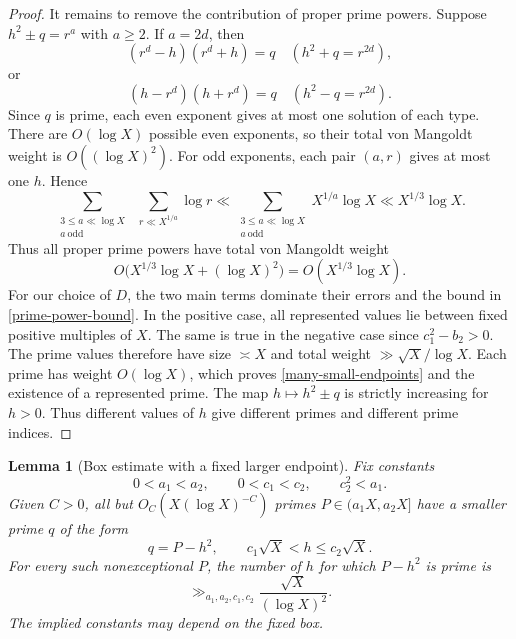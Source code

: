 \documentclass[12pt,reqno]{amsart}
\numberwithin{equation}{section}
\theoremstyle{plain}
\newtheorem{lemma}[theorem]{Lemma}
\theoremstyle{remark}
\begin{document}
\begin{proof}
It remains to remove the contribution of proper prime powers.  Suppose
$h^2\pm q=r^a$ with $a\geq2$.
If $a=2d$, then
\[
 (r^d-h)(r^d+h)=q\quad(h^2+q=r^{2d}),
\]
or
\[
 (h-r^d)(h+r^d)=q\quad(h^2-q=r^{2d}).
\]
Since $q$ is prime, each even exponent gives at most one solution of
each type.  There are $O(\log X)$ possible even exponents, so their
total von Mangoldt weight is $O((\log X)^2)$.  For odd exponents, each
pair $(a,r)$ gives at most one $h$.  Hence
\[
 \sum_{\substack{3\leq a\ll\log X\\a\ \mathrm{odd}}}
 \ \,\sum_{r\ll X^{1/a}}\log r
 \ll\sum_{\substack{3\leq a\ll\log X\\a\ \mathrm{odd}}}
 X^{1/a}\log X
 \ll X^{1/3}\log X.
\]
Thus all proper prime powers have total von Mangoldt weight
\begin{equation}\label{prime-power-bound}
 O\bigl(X^{1/3}\log X+(\log X)^2\bigr)
 =O(X^{1/3}\log X).
\end{equation}
For our choice of $D$, the two main terms dominate their errors and
the bound in \eqref{prime-power-bound}.  In the positive case, all
represented values lie between fixed positive multiples of $X$.  The
same is true in the negative case since $c_1^2-b_2>0$.  The prime
values therefore have size $\asymp X$ and total weight
$\gg\sqrt X/\log X$.  Each prime has weight $O(\log X)$, which proves
\eqref{many-small-endpoints} and the existence of a represented
prime.  The map $h\mapsto h^2\pm q$ is strictly increasing for $h>0$.
Thus different values of $h$ give different primes and different
prime indices.
\end{proof}

\begin{lemma}[Box estimate with a fixed larger endpoint]
\label{lem:good-large}
Fix constants
\begin{equation}\label{large-box-constants}
 0<a_1<a_2,\qquad 0<c_1<c_2,\qquad c_2^2<a_1.
\end{equation}
Given $C>0$, all but $O_C(X(\log X)^{-C})$ primes
$P\in(a_1X,a_2X]$ have a smaller prime $q$ of the form
\begin{equation*}\label{reverse-prime-in-box}
 q=P-h^2,
 \qquad c_1\sqrt X<h\leq c_2\sqrt X.
\end{equation*}
For every such nonexceptional $P$, the number of $h$ for which
$P-h^2$ is prime is
\begin{equation}\label{many-large-endpoints}
 \gg_{a_1,a_2,c_1,c_2}\frac{\sqrt X}{(\log X)^2}.
\end{equation}
The implied constants may depend on the fixed box.
\end{lemma}
\end{document}
